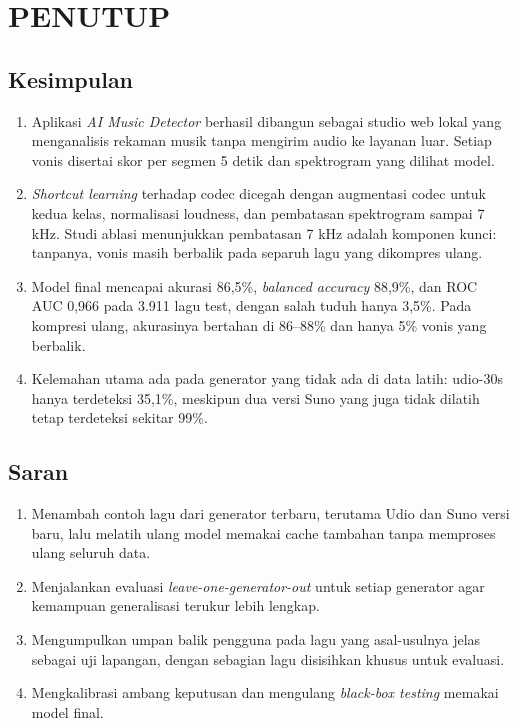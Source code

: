 \chapter{PENUTUP}

\section{Kesimpulan}
\begin{enumerate}
\item Aplikasi \textit{AI Music Detector} berhasil dibangun sebagai studio web lokal yang menganalisis rekaman musik tanpa mengirim audio ke layanan luar. Setiap vonis disertai skor per segmen 5 detik dan spektrogram yang dilihat model.
\item \textit{Shortcut learning} terhadap codec dicegah dengan augmentasi codec untuk kedua kelas, normalisasi loudness, dan pembatasan spektrogram sampai 7 kHz. Studi ablasi menunjukkan pembatasan 7 kHz adalah komponen kunci: tanpanya, vonis masih berbalik pada separuh lagu yang dikompres ulang.
\item Model final mencapai akurasi 86,5\%, \textit{balanced accuracy} 88,9\%, dan ROC AUC 0,966 pada 3.911 lagu test, dengan salah tuduh hanya 3,5\%. Pada kompresi ulang, akurasinya bertahan di 86--88\% dan hanya 5\% vonis yang berbalik.
\item Kelemahan utama ada pada generator yang tidak ada di data latih: udio-30s hanya terdeteksi 35,1\%, meskipun dua versi Suno yang juga tidak dilatih tetap terdeteksi sekitar 99\%.
\end{enumerate}

\section{Saran}
\begin{enumerate}
\item Menambah contoh lagu dari generator terbaru, terutama Udio dan Suno versi baru, lalu melatih ulang model memakai cache tambahan tanpa memproses ulang seluruh data.
\item Menjalankan evaluasi \textit{leave-one-generator-out} untuk setiap generator agar kemampuan generalisasi terukur lebih lengkap.
\item Mengumpulkan umpan balik pengguna pada lagu yang asal-usulnya jelas sebagai uji lapangan, dengan sebagian lagu disisihkan khusus untuk evaluasi.
\item Mengkalibrasi ambang keputusan dan mengulang \textit{black-box testing} memakai model final.
\end{enumerate}
